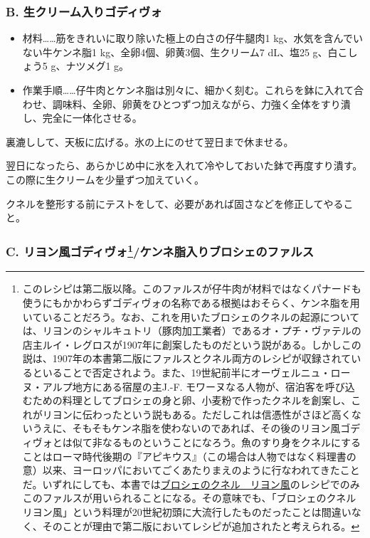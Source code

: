\begin{recette}
{\subsubsection{B. 生クリーム入りゴディヴォ}\label{godiveau-a-la-creme}}



\begin{itemize}
\item
  材料\ldots{}\ldots{}筋をきれいに取り除いた極上の白さの仔牛腿肉1
  kg、水気を含んでいない牛ケンネ脂1 kg、全卵4個、卵黄3個、生クリーム7
  dL、塩25 g、白こしょう5 g、ナツメグ1 g。
\item
  作業手順\ldots{}\ldots{}仔牛肉とケンネ脂は別々に、細かく刻む。これらを鉢に入れて合わせ、調味料、全卵、卵黄をひとつずつ加えながら、力強く全体をすり潰し、完全に一体化させる。
\end{itemize}

裏漉しして、天板に広げる。氷の上にのせて翌日まで休ませる。

翌日になったら、あらかじめ中に氷を入れて冷やしておいた鉢で再度すり潰す。この際に生クリームを少量ずつ加えていく。

クネルを整形する前にテストをして、必要があれば固さなどを修正してやること。

\hypertarget{godiveau-lyonnais}{%
\subsubsection[C.
リヨン風ゴディヴォ/ケンネ脂入りブロシェのファルス]{\texorpdfstring{C.
リヨン風ゴディヴォ\footnote{このレシピは第二版以降。このファルスが仔牛肉が材料ではなくパナードも使うにもかかわらずゴディヴォの名称である根拠はおそらく、ケンネ脂を用いていることだろう。なお、これを用いたブロシェのクネルの起源については、リヨンのシャルキュトリ（豚肉加工業者）であるオ・プチ・ヴァテルの店主ルイ・レグロスが1907年に創案したものだという説がある。しかしこの説は、1907年の本書第二版にファルスとクネル両方のレシピが収録されているといることで否定されよう。また、19世紀前半にオーヴェルニュ・ローヌ・アルプ地方にある宿屋の主J.-F.
  モワーヌなる人物が、宿泊客を呼び込むための料理としてブロシェの身と卵、小麦粉で作ったクネルを創案し、これがリヨンに伝わったという説もある。ただしこれは信憑性がさほど高くないうえに、そもそもケンネ脂を使わないのであれば、その後のリヨン風ゴディヴォとは似て非なるものということになろう。魚のすり身をクネルにすることはローマ時代後期の『アピキウス』（この場合は人物ではなく料理書の意）以来、ヨーロッパにおいてごくあたりまえのように行なわれてきたことだ。いずれにしても、本書では\protect\hyperlink{quenelles-de-brochet-lyonnaise}{ブロシェのクネル　リヨン風}のレシピでのみこのファルスが用いられることになる。その意味でも、「ブロシェのクネル　リヨン風」という料理が20世紀初頭に大流行したものだったことは間違いなく、そのことが理由で第二版においてレシピが追加されたと考えられる。}/ケンネ脂入りブロシェのファルス}{C. リヨン風ゴディヴォ/ケンネ脂入りブロシェのファルス}}\label{godiveau-lyonnais}}


\end{recette}
